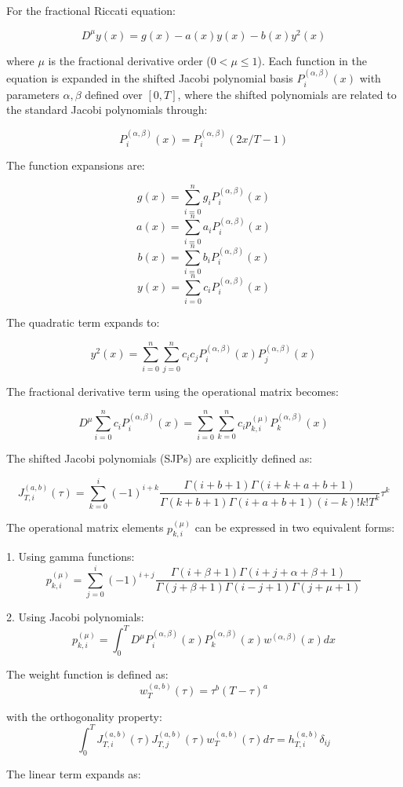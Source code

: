 \documentclass{article}
\begin{document}
For the fractional Riccati equation:

\[ D^\mu y(x) = g(x) - a(x)y(x) - b(x)y^2(x) \]

where $\mu$ is the fractional derivative order ($0 < \mu \leq 1$). Each function in the equation is expanded in the shifted Jacobi polynomial basis $P_i^{(\alpha,\beta)}(x)$ with parameters $\alpha, \beta$ defined over $[0,T]$, where the shifted polynomials are related to the standard Jacobi polynomials through:

\[ P_i^{(\alpha,\beta)}(x) = P_i^{(\alpha,\beta)}(2x/T - 1) \]

The function expansions are:

\[ g(x) = \sum_{i=0}^{n} g_i P_i^{(\alpha,\beta)}(x) \]
\[ a(x) = \sum_{i=0}^{n} a_i P_i^{(\alpha,\beta)}(x) \]
\[ b(x) = \sum_{i=0}^{n} b_i P_i^{(\alpha,\beta)}(x) \]
\[ y(x) = \sum_{i=0}^{n} c_i P_i^{(\alpha,\beta)}(x) \]

The quadratic term expands to:

\[ y^2(x) = \sum_{i=0}^{n}\sum_{j=0}^{n} c_ic_j P_i^{(\alpha,\beta)}(x)P_j^{(\alpha,\beta)}(x) \]

The fractional derivative term using the operational matrix becomes:

\[ D^\mu \sum_{i=0}^{n} c_i P_i^{(\alpha,\beta)}(x) = \sum_{i=0}^{n}\sum_{k=0}^{n} c_i p_{k,i}^{(\mu)} P_k^{(\alpha,\beta)}(x) \]

The shifted Jacobi polynomials (SJPs) are explicitly defined as:

\[ J_{T,i}^{(a,b)}(\tau) = \sum_{k=0}^{i}(-1)^{i+k} \frac{\Gamma(i+b+1)\Gamma(i+k+a+b+1)}{\Gamma(k+b+1)\Gamma(i+a+b+1)(i-k)!k!T^k}\tau^k \]

The operational matrix elements $p_{k,i}^{(\mu)}$ can be expressed in two equivalent forms:

1. Using gamma functions:
\[ p_{k,i}^{(\mu)} = \sum_{j=0}^{i} (-1)^{i+j} \frac{\Gamma(i+\beta+1)\Gamma(i+j+\alpha+\beta+1)}{\Gamma(j+\beta+1)\Gamma(i-j+1)\Gamma(j+\mu+1)} \]

2. Using Jacobi polynomials:
\[ p_{k,i}^{(\mu)} = \int_0^T D^\mu P_i^{(\alpha,\beta)}(x)P_k^{(\alpha,\beta)}(x)w^{(\alpha,\beta)}(x)dx \]

The weight function is defined as:
\[ w_T^{(a,b)}(\tau) = \tau^b(T-\tau)^a \]

with the orthogonality property:
\[ \int_0^T J_{T,i}^{(a,b)}(\tau)J_{T,j}^{(a,b)}(\tau)w_T^{(a,b)}(\tau)d\tau = h_{T,i}^{(a,b)}\delta_{ij} \]

The linear term expands as:
\end{document}
